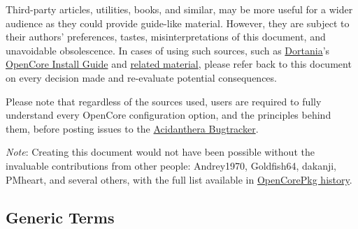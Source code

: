 \documentclass[]{article}
\begin{document}
Third-party articles, utilities, books, and similar, may be more useful for a wider audience as
they could provide guide-like material. However, they are subject to their authors' preferences,
tastes, misinterpretations of this document, and unavoidable obsolescence.
In cases of using such sources, such as \href{https://dortania.github.io}{Dortania}'s
\href{https://dortania.github.io/OpenCore-Install-Guide}{OpenCore Install Guide}
and \href{https://dortania.github.io/getting-started}{related material},
please refer back to this document on every decision made and re-evaluate potential consequences.

Please note that regardless of the sources used, users are required to fully understand every
OpenCore configuration option, and the principles behind them, before posting issues to the
\href{https://github.com/acidanthera/bugtracker}{Acidanthera Bugtracker}.

\emph{Note}: Creating this document would not have been possible without the invaluable
contributions from other people: Andrey1970, Goldfish64, dakanji, PMheart, and several others,
with the full list available in
\href{https://github.com/acidanthera/OpenCorePkg/commits/master/Docs}{OpenCorePkg history}.

\subsection{Generic Terms}\label{generic-terms}
\end{document}
